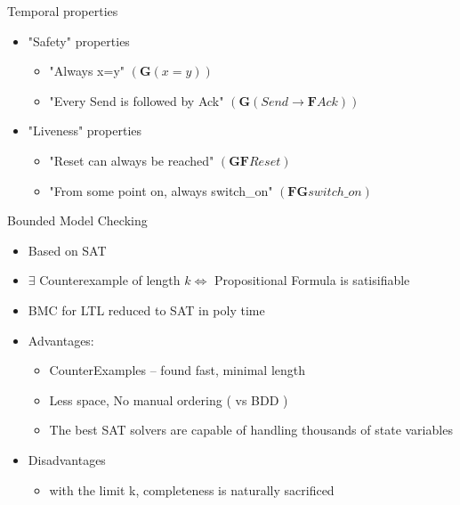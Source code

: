 \documentclass{beamer}
\begin{document}
\begin{frame}{Temporal properties}
\begin{itemize}
\item "Safety" properties
    \begin{itemize}
    \item "Always x=y"\newline
          $(\textbf{G}(x=y))$
    \item "Every Send is followed by Ack"\newline
          $(\textbf{G}(Send \rightarrow \textbf{F} Ack))$
    \end{itemize}
\item "Liveness" properties
    \begin{itemize}
    \item "Reset can always be reached"\newline
          $(\textbf{GF}Reset)$
    \item "From some point on, always switch\_on"\newline
          $(\textbf{FG} switch\_on)$
    \end{itemize}
\end{itemize}
\end{frame}

\begin{frame}{Bounded Model Checking}
\begin{itemize}
\item Based on SAT
\item $\exists$ Counterexample of length $k \iff$ Propositional Formula is satisifiable
\item BMC for LTL reduced to SAT in poly time
\item Advantages:
\begin{itemize}
\item CounterExamples – found fast, minimal length
\item Less space, No manual ordering ( vs BDD )
\item The best SAT solvers are capable of handling thousands of state variables
\end{itemize}
\item Disadvantages
\begin{itemize}
\item with the limit k, completeness is naturally sacrificed
\end{itemize}
\end{itemize}
\end{frame}
\end{document}
